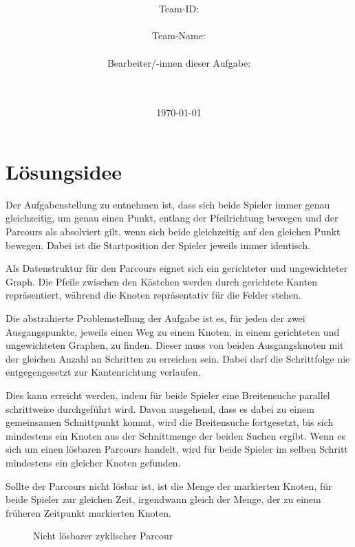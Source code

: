 \documentclass[a4paper,10pt,ngerman]{scrartcl}
\title{\textbf{\Huge\Aufgabe}}
\author{\LARGE Team-ID: \LARGE \TeamId \\\\
\LARGE Team-Name: \LARGE \TeamName \\\\
\LARGE Bearbeiter/-innen dieser Aufgabe: \\
\LARGE \Namen\\\\}
\date{\LARGE\today}
\begin{document}
    \maketitle
    \tableofcontents

    \vspace{0.5cm}

    \section{Lösungsidee}\label{sec:losungsidee}
    Der Aufgabenstellung zu entnehmen ist,
    dass sich beide Spieler immer genau gleichzeitig,
    um genau einen Punkt,
    entlang der Pfeilrichtung bewegen und der Parcours als absolviert gilt,
    wenn sich beide gleichzeitig auf den gleichen Punkt bewegen.
    Dabei ist die Startposition der Spieler jeweils immer identisch.
    
    Als Datenstruktur für den Parcours eignet sich ein gerichteter und ungewichteter Graph.
    Die Pfeile zwischen den Kästchen werden durch gerichtete Kanten repräsentiert,
    während die Knoten repräsentativ für die Felder stehen.
    
    Die abstrahierte Problemstellung der Aufgabe ist es,
    für jeden der zwei Ausgangspunkte,
    jeweils einen Weg zu einem Knoten, 
    in einem gerichteten und ungewichteten Graphen, 
    zu finden.
    Dieser muss von beiden Ausgangsknoten mit der gleichen Anzahl an Schritten zu erreichen sein.
    Dabei darf die Schrittfolge nie entgegengesetzt zur Kantenrichtung verlaufen.
    
    Dies kann erreicht werden,
    indem für beide Spieler eine Breitensuche parallel schrittweise durchgeführt wird.
    Davon ausgehend, dass es dabei zu einem gemeinsamen Schnittpunkt kommt,
    wird die Breitensuche fortgesetzt, 
    bis sich mindestens ein Knoten aus der Schnittmenge der beiden Suchen ergibt.
    Wenn es sich um einen lösbaren Parcours handelt,
    wird für beide Spieler im selben Schritt mindestens ein gleicher Knoten gefunden.
    
    Sollte der Parcours nicht lösbar ist, 
    ist die Menge der markierten Knoten,
    für beide Spieler zur gleichen Zeit,
    irgendwann gleich der Menge,
    der zu einem früheren Zeitpunkt markierten Knoten. 
    
    \begin{figure}
    \centering
    \InfinityLoop{}
    \caption{Nicht lösbarer zyklischer Parcour}
    \label{fig:Figure1}
    \end{figure}
    
\end{document}
